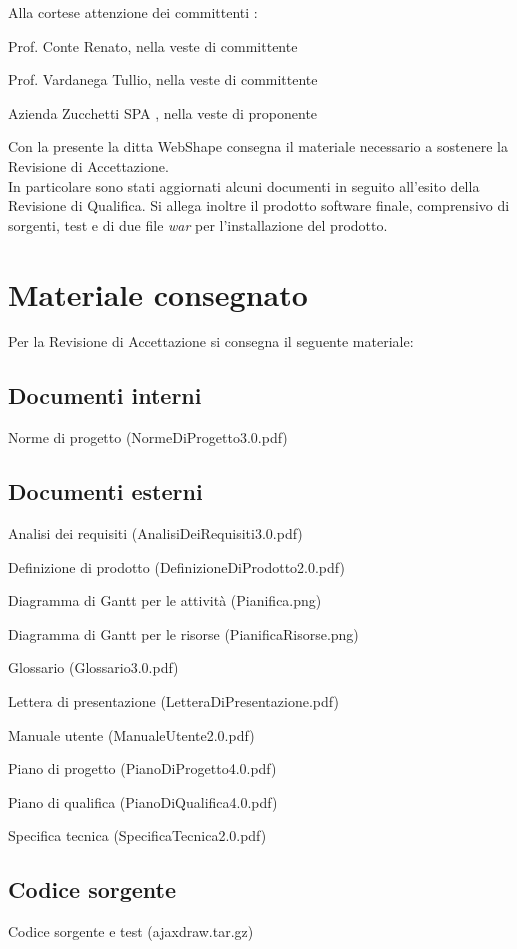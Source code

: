Alla cortese attenzione dei committenti :
\begin{list}{-}{}
\item Prof. Conte Renato, nella veste di committente
\item Prof. Vardanega Tullio, nella veste di committente
\item Azienda Zucchetti SPA , nella veste di proponente
\end{list}

Con la presente la ditta WebShape consegna il materiale necessario a sostenere la Revisione di Accettazione. \\
In particolare sono stati aggiornati alcuni documenti in seguito all'esito della Revisione di Qualifica. Si allega inoltre il prodotto software finale, comprensivo di sorgenti, test e di due file \textit{war} per l'installazione del prodotto.


\section{Materiale consegnato}
Per la Revisione di Accettazione si consegna il seguente materiale: 
\subsection{Documenti interni}
\begin{list}{-}{}
\item Norme di progetto (NormeDiProgetto3.0.pdf)
\end{list}
\subsection{Documenti esterni}
\begin{list}{-}{}
\item Analisi dei requisiti (AnalisiDeiRequisiti3.0.pdf)
\item Definizione di prodotto (DefinizioneDiProdotto2.0.pdf)
\item Diagramma di Gantt per le attivit\`a (Pianifica.png)
\item Diagramma di Gantt per le risorse (PianificaRisorse.png)
\item Glossario (Glossario3.0.pdf)
\item Lettera di presentazione (LetteraDiPresentazione.pdf)
\item Manuale utente (ManualeUtente2.0.pdf)
\item Piano di progetto (PianoDiProgetto4.0.pdf)
\item Piano di qualifica (PianoDiQualifica4.0.pdf)
\item Specifica tecnica (SpecificaTecnica2.0.pdf)
\end{list}
\subsection{Codice sorgente}
\begin{list}{-}{}
\item Codice sorgente e test (ajaxdraw.tar.gz)
\end{list}



